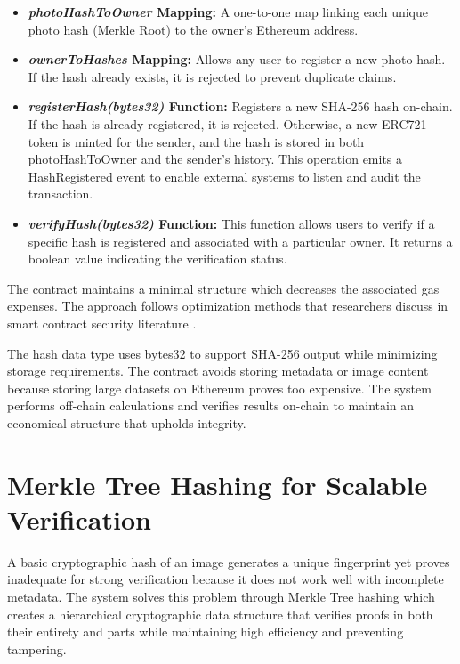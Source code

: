\begin{itemize}
    \item {\textbf{\textit{photoHashToOwner} Mapping: }} A one-to-one map linking each unique photo hash (Merkle Root) to the owner's Ethereum address.
    \item {\textbf{\textit{ownerToHashes} Mapping: }} Allows any user to register a new photo hash. If the hash already exists, it is rejected to prevent duplicate claims.
    \item {\textbf{\textit{registerHash(bytes32)} Function: }} Registers a new SHA-256 hash on-chain. If the hash is already registered, it is rejected. Otherwise, a new ERC721 token is minted for the sender, and the hash is stored in both photoHashToOwner and the sender’s history. This operation emits a HashRegistered event to enable external systems to listen and audit the transaction.
    \item {\textbf{\textit{verifyHash(bytes32)} Function: }} This function allows users to verify if a specific hash is registered and associated with a particular owner. It returns a boolean value indicating the verification status.
\end{itemize}

The contract maintains a minimal structure which decreases the associated gas expenses. The approach follows optimization methods that researchers discuss in smart contract security literature \cite{blockChainAndBeyod}.

The hash data type uses bytes32 to support SHA-256 output while minimizing storage requirements. The contract avoids storing metadata or image content because storing large datasets on Ethereum proves too expensive. The system performs off-chain calculations and verifies results on-chain to maintain an economical structure that upholds integrity.


\section{Merkle Tree Hashing for Scalable Verification}
A basic cryptographic hash of an image generates a unique fingerprint yet proves inadequate for strong verification because it does not work well with incomplete metadata. The system solves this problem through Merkle Tree hashing which creates a hierarchical cryptographic data structure that verifies proofs in both their entirety and parts while maintaining high efficiency and preventing tampering.

